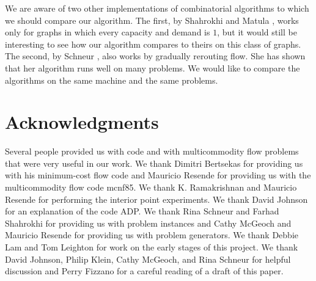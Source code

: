 We are aware of two other implementations of combinatorial algorithms
to which we should compare our algorithm.  The first, by Shahrokhi and
Matula \cite{ShahrokhiM88}, 
works only for graphs in which every capacity and demand is $1$,
but it would still be interesting to see how our algorithm compares to
theirs on this class of graphs.  The second, by Schneur
\cite{Schneur91}, 
also works by
gradually rerouting flow.  She has shown that her algorithm runs well on
many problems.  We would like to compare the algorithms on the same
machine and  the same problems.

\section*{Acknowledgments}
Several people provided us with code and with multicommodity flow
problems that were very useful in our work.  We thank Dimitri
Bertsekas for providing us with his minimum-cost flow code and
Mauricio Resende for providing us with the multicommodity flow code
{\sc mcnf85}.  We thank K. Ramakrishnan and Mauricio Resende for
performing the interior point experiments.  We thank David Johnson for
an explanation of the code ADP.  We thank Rina Schneur and Farhad
Shahrokhi for providing us with problem instances and Cathy McGeoch
and Mauricio Resende for providing us with problem generators.  We
thank Debbie Lam and Tom Leighton for work on the early stages of this
project.  We thank David Johnson, Philip Klein, Cathy McGeoch, and
Rina Schneur for helpful discussion and Perry Fizzano for a careful
reading of a draft of this paper.

%
%



